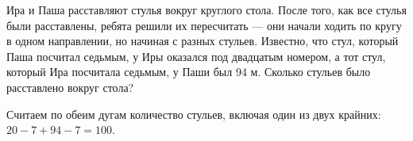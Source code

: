 
Ира и Паша расставляют стулья вокруг круглого стола. После того, как все стулья были расставлены, ребята решили их пересчитать — они начали ходить по кругу в одном направлении, но начиная с разных стульев. Известно, что стул, который Паша посчитал седьмым, у Иры оказался под двадцатым номером, а тот стул, который Ира посчитала седьмым, у Паши был 94 м. Сколько стульев было расставлено вокруг стола?

\solutionSection


Считаем по обеим дугам количество стульев, включая один из двух крайних: $20 - 7 + 94 - 7 = 100$.

